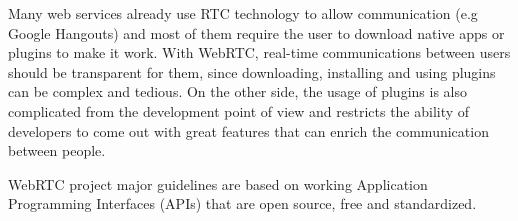 Many web services already use RTC technology to allow communication (e.g Google Hangouts) and most of them require the user to download native apps or plugins to make it work. With WebRTC, real-time communications between users should be transparent for them, since downloading, installing and using plugins can be complex and tedious. On the other side, the usage of plugins is also complicated from the development point of view and restricts the ability of developers to come out with great features that can enrich the communication between people.

WebRTC project major guidelines are based on working Application Programming Interfaces (APIs)  that are open source, free and standardized.


%
%
%
